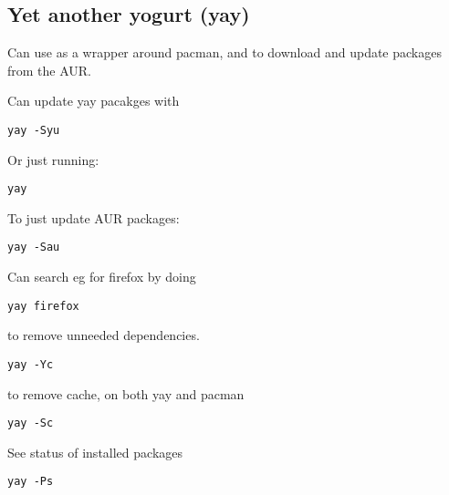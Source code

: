 
\subsection{Yet another yogurt (yay)}

Can use as a wrapper around pacman, and to download and update packages from the AUR.

Can update yay pacakges with 

\begin{verbatim}
yay -Syu
\end{verbatim}

Or just running:

\begin{verbatim}
yay
\end{verbatim}

To just update AUR packages:

\begin{verbatim}
yay -Sau
\end{verbatim}

Can search eg for firefox by doing 

\begin{verbatim}
yay firefox
\end{verbatim}

to remove unneeded dependencies.
\begin{verbatim}
yay -Yc
\end{verbatim}

to remove cache, on both yay and pacman
\begin{verbatim}
yay -Sc
\end{verbatim}

See status of installed packages

\begin{verbatim}
yay -Ps
\end{verbatim}

